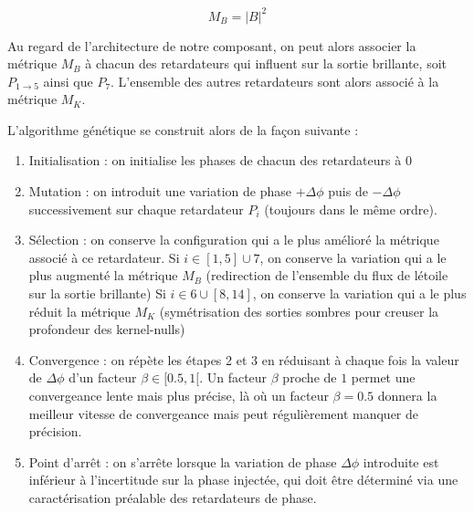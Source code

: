 \documentclass{aa}
\begin{document}
            \begin{equation}
                M_B = |B|^2
            \end{equation}
            
            Au regard de l'architecture de notre composant, on peut alors associer la métrique $M_B$ à chacun des retardateurs qui influent sur la sortie brillante, soit $P_{1 \rightarrow 5}$ ainsi que $P_7$. L'ensemble des autres retardateurs sont alors associé à la métrique $M_K$.

            L'algorithme génétique se construit alors de la façon suivante :

            \begin{enumerate}
                \item Initialisation : on initialise les phases de chacun des retardateurs à 0
                \item Mutation : on introduit une variation de phase $+ \Delta \phi$ puis de $- \Delta \phi$ successivement sur chaque retardateur $P_i$ (toujours dans le même ordre).
                \item Sélection : on conserve la configuration qui a le plus amélioré la métrique associé à ce retardateur.
                    \subitem Si $i \in [1, 5] \cup 7$, on conserve la variation qui a le plus augmenté la métrique $M_B$ (redirection de l'ensemble du flux de létoile sur la sortie brillante)
                    \subitem Si $i \in 6 \cup [8, 14]$, on conserve la variation qui a le plus réduit la métrique $M_K$ (symétrisation des sorties sombres pour creuser la profondeur des kernel-nulls)
                \item Convergence : on répète les étapes 2 et 3 en réduisant à chaque fois la valeur de $\Delta \phi$ d'un facteur $\beta \in [0.5,1[$. Un facteur $\beta$ proche de $1$ permet une convergeance lente mais plus précise, là où un facteur $\beta = 0.5$ donnera la meilleur vitesse de convergeance mais peut régulièrement manquer de précision.
                \item Point d'arrêt : on s'arrête lorsque la variation de phase $\Delta \phi$ introduite est inférieur à l'incertitude sur la phase injectée, qui doit être déterminé via une caractérisation préalable des retardateurs de phase.
            \end{enumerate}
            
\end{document}
